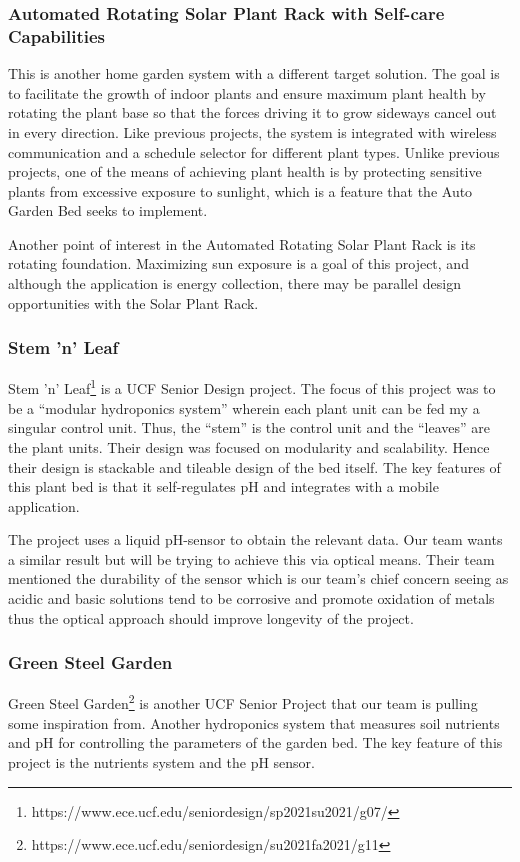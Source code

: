 \subsubsection{Automated Rotating Solar Plant Rack with Self-care Capabilities}

This is another home garden system with a different target solution. The goal is to facilitate the growth of indoor plants and ensure maximum plant health by rotating the plant base so that the forces driving it to grow sideways cancel out in every direction. Like previous projects, the system is integrated with wireless communication and a schedule selector for different plant types. Unlike previous projects, one of the means of achieving plant health is by protecting sensitive plants from excessive exposure to sunlight, which is a feature that the Auto Garden Bed seeks to implement. 

Another point of interest in the Automated Rotating Solar Plant Rack is its rotating foundation. Maximizing sun exposure is a goal of this project, and although the application is energy collection, there may be parallel design opportunities with the Solar Plant Rack.


\subsubsection{Stem 'n' Leaf}
Stem 'n' Leaf\footnote{https://www.ece.ucf.edu/seniordesign/sp2021su2021/g07/} is a UCF Senior Design project. The focus of this project was to be a ``modular hydroponics system'' wherein each plant unit can be fed my a singular control unit. Thus, the ``stem'' is the control unit and the ``leaves'' are the plant units. Their design was focused on modularity and scalability. Hence their design is stackable and tileable design of the bed itself. The key features of this plant bed is that it self-regulates pH and integrates with a mobile application.

The project uses a liquid pH-sensor to obtain the relevant data. Our team wants a similar result but will be trying to achieve this via optical means. Their team mentioned the durability of the sensor which is our team's chief concern seeing as acidic and basic solutions tend to be corrosive and promote oxidation of metals thus the optical approach should improve longevity of the project. 
\subsubsection{Green Steel Garden}
Green Steel Garden\footnote{https://www.ece.ucf.edu/seniordesign/su2021fa2021/g11} is another UCF Senior Project that our team is pulling some inspiration from. Another hydroponics system that measures soil nutrients and pH for controlling the parameters of the garden bed. The key feature of this project is the nutrients system and the pH sensor.

